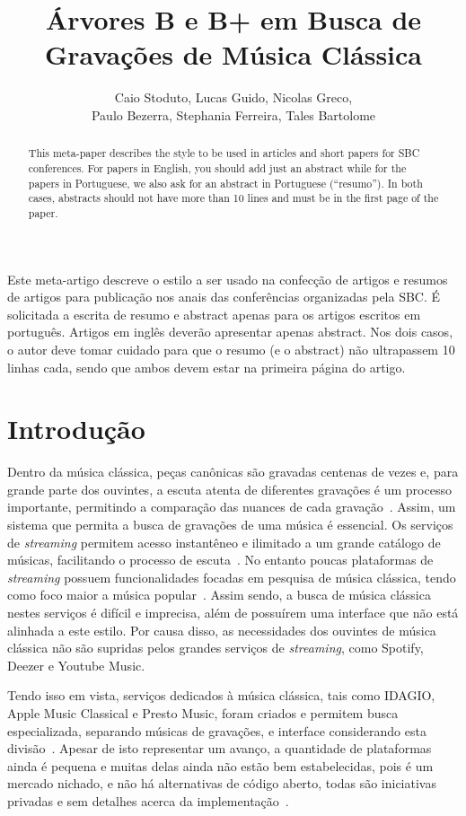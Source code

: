 \documentclass[12pt]{article}
\title{Árvores B e B\nolinebreak+ em Busca de Gravações de Música Clássica\\}
\author{Caio Stoduto\inst{1}, Lucas Guido\inst{1}, Nicolas Greco\inst{1},\\
Paulo Bezerra\inst{1}, Stephania Ferreira\inst{1}, Tales Bartolome\inst{1}}
\begin{document}
 

\maketitle

\begin{abstract}
  This meta-paper describes the style to be used in articles and short papers
  for SBC conferences. For papers in English, you should add just an abstract
  while for the papers in Portuguese, we also ask for an abstract in Portuguese
  (``resumo''). In both cases, abstracts should not have more than 10 lines and
  must be in the first page of the paper.
\end{abstract}
     
\begin{resumo} 
  Este meta-artigo descreve o estilo a ser usado na confecção de artigos e
  resumos de artigos para publicação nos anais das conferências organizadas pela
  SBC. É solicitada a escrita de resumo e abstract apenas para os artigos
  escritos em português. Artigos em inglês deverão apresentar apenas abstract.
  Nos dois casos, o autor deve tomar cuidado para que o resumo (e o abstract)
  não ultrapassem 10 linhas cada, sendo que ambos devem estar na primeira página
  do artigo.
\end{resumo}

\section{Introdução}
Dentro da música clássica, peças canônicas são gravadas centenas de vezes e,
para grande parte dos ouvintes, a escuta atenta de diferentes gravações é um
processo importante, permitindo a comparação das nuances de cada gravação~\cite{Bl:25}.
Assim, um sistema que permita a busca de gravações de uma música é essencial.
Os serviços de \emph{streaming} permitem acesso instantêneo e ilimitado a um
grande catálogo de músicas, facilitando o processo de escuta~\cite{MoVi:18}.
No entanto poucas plataformas de \emph{streaming} possuem funcionalidades focadas em
pesquisa de música clássica, tendo como foco maior a música popular~\cite{Bl:25}.
Assim sendo, a busca de música clássica nestes serviços é difícil e imprecisa, 
além de possuírem uma interface que não está alinhada a este estilo.
Por causa disso, as necessidades dos ouvintes de música clássica não são supridas
pelos grandes serviços de \emph{streaming}, como Spotify, Deezer e Youtube Music.

Tendo isso em vista, serviços dedicados à música clássica, tais como
IDAGIO, Apple Music Classical e Presto Music, foram criados e permitem busca
especializada, separando músicas de gravações, e interface considerando esta
divisão~\cite{Bl:25}.
Apesar de isto representar um avanço, a quantidade de plataformas ainda é pequena
e muitas delas ainda não estão bem estabelecidas, pois é um mercado nichado, e 
não há alternativas de código aberto, todas são iniciativas privadas e sem
detalhes acerca da implementação~\cite{Bl:25}.
\end{document}
